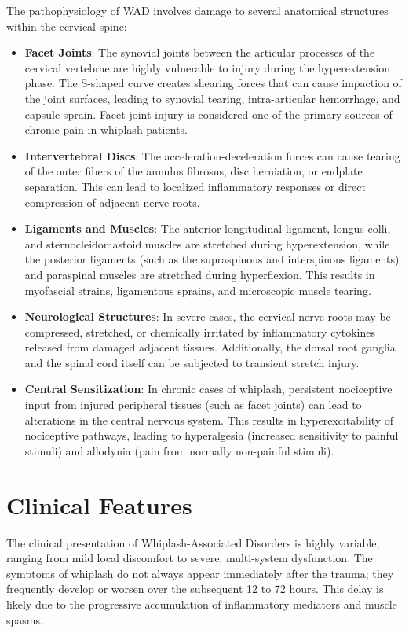 The pathophysiology of WAD involves damage to several anatomical structures within the cervical spine:
\begin{itemize}
    \item \textbf{Facet Joints}: The synovial joints between the articular processes of the cervical vertebrae are highly vulnerable to injury during the hyperextension phase. The S-shaped curve creates shearing forces that can cause impaction of the joint surfaces, leading to synovial tearing, intra-articular hemorrhage, and capsule sprain. Facet joint injury is considered one of the primary sources of chronic pain in whiplash patients.
    \item \textbf{Intervertebral Discs}: The acceleration-deceleration forces can cause tearing of the outer fibers of the annulus fibrosus, disc herniation, or endplate separation. This can lead to localized inflammatory responses or direct compression of adjacent nerve roots.
    \item \textbf{Ligaments and Muscles}: The anterior longitudinal ligament, longus colli, and sternocleidomastoid muscles are stretched during hyperextension, while the posterior ligaments (such as the supraspinous and interspinous ligaments) and paraspinal muscles are stretched during hyperflexion. This results in myofascial strains, ligamentous sprains, and microscopic muscle tearing.
    \item \textbf{Neurological Structures}: In severe cases, the cervical nerve roots may be compressed, stretched, or chemically irritated by inflammatory cytokines released from damaged adjacent tissues. Additionally, the dorsal root ganglia and the spinal cord itself can be subjected to transient stretch injury.
    \item \textbf{Central Sensitization}: In chronic cases of whiplash, persistent nociceptive input from injured peripheral tissues (such as facet joints) can lead to alterations in the central nervous system. This results in hyperexcitability of nociceptive pathways, leading to hyperalgesia (increased sensitivity to painful stimuli) and allodynia (pain from normally non-painful stimuli).
\end{itemize}

\section*{Clinical Features}
The clinical presentation of Whiplash-Associated Disorders is highly variable, ranging from mild local discomfort to severe, multi-system dysfunction. The symptoms of whiplash do not always appear immediately after the trauma; they frequently develop or worsen over the subsequent 12 to 72 hours. This delay is likely due to the progressive accumulation of inflammatory mediators and muscle spasms.

